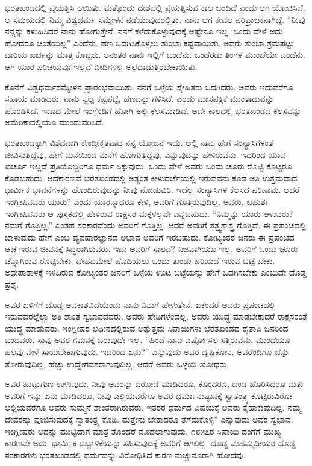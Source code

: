 ಭರತಖಂಡದಲ್ಲಿ ಪ್ರಯತ್ನಿಸಿ ಆಯಿತು. ಮತ್ತೊಂದು ದೇಶದಲ್ಲಿ ಪ್ರಯತ್ನಿಸುವ ಕಾಲ ಬಂದಿದೆ ಎಂದು ಆಗ ಯೋಚಿಸಿದೆ. ಆ ಸಮಯದಲ್ಲಿ ನಿಮ್ಮ ವಿಶ್ವಧರ್ಮ ಸಮ್ಮೇಳನ ನಡೆಯುವುದರಲ್ಲಿತ್ತು. ನಾನು ಆಗ ಕೇವಲ ಪರಿವ್ರಾಜಕನಾಗಿದ್ದೆ. “ನೀವು ನನ್ನನ್ನು ಕಳುಹಿಸಿದರೆ ನಾನು ಹೋಗುತ್ತೇನೆ. ನನಗೆ ಕಳೆದುಕೊಳ್ಳುವುದಕ್ಕೆ ಅಷ್ಟೇನೂ ಇಲ್ಲ. ಒಂದು ವೇಳೆ ಅದು ಹೋದರೂ ಚಿಂತೆಯಿಲ್ಲ” ಎಂದೆನು. ಹಣ ಒದಗಿಸಿಕೊಳ್ಳಲು ತುಂಬಾ ಕಷ್ಟವಾಯಿತು. ಅವರು ತುಂಬಾ ಶ್ರಮಪಟ್ಟು ದಾರಿಯ ಖರ್ಚನ್ನು ಮಾತ್ರ ಕೊಟ್ಟರು. ಅನಂತರ ನಾನು ಇಲ್ಲಿಗೆ ಬಂದೆನು. ಒಂದೆರಡು ತಿಂಗಳ ಮುಂಚೆಯೇ ಬಂದೆನು. ಆಗ ಯಾರ ಪರಿಚಯವೂ ಇಲ್ಲದೆ ಬೀದಿಗಳಲ್ಲಿ ಅಲೆದಾಡುತ್ತಿರಬೇಕಾಯಿತು.

ಕೊನೆಗೆ ವಿಶ್ವಧರ್ಮಸಮ್ಮೇಳನ ಪ್ರಾರಂಭವಾಯಿತು. ನನಗೆ ಒಳ್ಳೆಯ ಸ್ನೇಹಿತರು ಒದಗಿದರು. ಅವರು ಇದುವರೆಗೂ ಸಹಾಯ ಮಾಡಿದರು. ನಾನು ಸ್ವಲ್ಪ ಕಷ್ಟಪಟ್ಟೆ, ಹಣವನ್ನು ಗಳಿಸಿದೆ. ಎರಡು ಮಾಸಪತ್ರಿಕೆ ಮುಂತಾದುವನ್ನು ಹೊರಡಿಸಿದೆ. ಇದಾದ ಮೇಲೆ ಇಂಗ್ಲೆಂಡಿಗೆ ಹೋಗಿ ಅಲ್ಲಿ ಕೆಲಸಮಾಡಿದೆ. ಅದೇ ಕಾಲದಲ್ಲಿ ಭರತಖಂಡದ ಕೆಲಸವನ್ನು ಅಮೆರಿಕಾದಲ್ಲಿಯೂ ಮುಂದುವರಿಸಿದೆ.

ಭರತಖಂಡಕ್ಕಾಗಿ ವಿಶದವಾಗಿ ಕೇಂದ್ರೀಕೃತವಾದ ನನ್ನ ಯೋಜನೆ ಇದು. ಅಲ್ಲಿ ನಾವು ಹೇಗೆ ಸಂನ್ಯಾಸಿಗಳಂತೆ ಜೀವಿಸುತ್ತಿದ್ದೆವು, ಹೇಗೆ ಮನೆಯಿಂದ ಮನೆಗೆ ಹೋಗುತ್ತಿದ್ದೆವು, ಎನ್ನುವುದನ್ನು ಹೇಳಿರುವೆನು. ಇದರಿಂದ ಯಾವ ಖರ್ಚೂ ಇಲ್ಲದೆ ಪ್ರತಿಯೊಬ್ಬರಿಗೂ ಧರ್ಮ ಸಿಕ್ಕುವುದು. ಒಂದು ವೇಳೆ ಅವರು ಒಂದು ಚೂರು ರೊಟ್ಟಿ ಕೊಟ್ಟರೂ ಕೊಡಬಹುದು. ಆದಕಾರಣವೆ ಭರತಖಂಡದಲ್ಲಿ ಅತ್ಯಂತ ಕೀಳುದರ್ಜೆಯಲ್ಲಿ ಇರುವವನು ಕೂಡ ಅತಿ ಉತ್ತಮವಾದ ಧಾರ್ಮಿಕ ಭಾವನೆಗಳನ್ನು ಹೊಂದಿರುವುದನ್ನು ನೀವು ನೋಡುವಿರಿ. ಇದೆಲ್ಲ ಸಂನ್ಯಾಸಿಗಳ ಕೆಲಸದ ಪರಿಣಾಮ. ಆದರೆ ಇಂಗ್ಲೀಷಿನವರು ಯಾರು? ಎಂದು ಯಾರನ್ನಾದರೂ ಕೇಳಿ, ಅವರಿಗೆ ಗೊತ್ತಿರುವುದಿಲ್ಲ. ಅವರು, ಬಹುಶಃ ಇಂಗ್ಲೀಷಿನವರು ಆ ಪುಸ್ತಕದಲ್ಲಿ ಹೇಳಿರುವ ರಾಕ್ಷಸರ ಮಕ್ಕಳಲ್ಲವೇ ಎನ್ನಬಹುದು. “ನಿಮ್ಮನ್ನು ಯಾರು ಆಳುವರು? ನಮಗೆ ಗೊತ್ತಿಲ್ಲ.” ಎಂತಹ ಸರಕಾರವೆಂದು ಅವರಿಗೆ ಗೊತ್ತಿಲ್ಲ. ಆದರೆ ಅವರಿಗೆ ತತ್ತ್ವಶಾಸ್ತ್ರ ಗೊತ್ತಿದೆ. ಈ ಪ್ರಪಂಚದಲ್ಲಿ ಬಾಳುವುದು ಹೇಗೆ ಎಂಬ ವ್ಯವಹಾರಜ್ಞಾನದ ಅಭಾವ ಅವರಿಗೆ ಇರಬಹುದು. ಕೋಟ್ಯಂತರ ಜನರು ಈ ಪ್ರಪಂಚದ ಆಚೆ ಇರುವ ಜೀವನಕ್ಕೆ ಸಿದ್ಧರಾಗಿರುವರು. ಇದು ಅವರಿಗೆ ಸಾಲದೆ? ನಿಜವಾಗಿಯೂ ಇಲ್ಲ. ಅವರಿಗೆ ಒಂದು ಚೂರು ಚೆನ್ನಾಗಿರುವ ರೊಟ್ಟಿಬೇಕು. ದೇಹದಮೇಲೆ ಹೊದಿಯಲು ಒಂದು ತುಂಡು ಹರಿಯದೆ ಇರುವ ಬಟ್ಟೆ ಬೇಕು. ಅಧಃಪಾತಾಳಕ್ಕೆ ಇಳಿದಿರುವ ಕೋಟ್ಯಂತರ ಜನರಿಗೆ ಒಳ್ಳೆಯ ಊಟ ಬಟ್ಟೆಯನ್ನು ಹೇಗೆ ಒದಗಿಸಬೇಕು ಎಂಬುದೇ ದೊಡ್ಡ ಪ್ರಶ್ನೆ.

ಅವರ ಏಳಿಗೆಗೆ ದೊಡ್ಡ ಅವಕಾಶವಿದೆಯೆಂದು ನಾನು ನಿಮಗೆ ಹೇಳುತ್ತೇನೆ. ಏಕೆಂದರೆ ಅವರು ಪ್ರಪಂಚದಲ್ಲಿ ಇರುವವರಲ್ಲೆಲ್ಲಾ ಅತಿ ಶಾಂತ ಸ್ವಭಾವದವರು. ಅವರು ಹೇಡಿಗಳೆಂದಲ್ಲ. ಅವರು ಯುದ್ಧ ಮಾಡಬೇಕಾದರೆ ರಾಕ್ಷಸರಂತೆ ಯುದ್ಧ ಮಾಡುವರು. ಇಂಗ್ಲೀಷರ ಅಧೀನದಲ್ಲಿರುವ ಅತ್ಯುತ್ತಮ ಸಿಪಾಯಿಗಳು ಭರತಖಂಡದ ರೈತಾಪಿ ಜನರಿಂದ ಬಂದವರು. ಸಾವು ಅವರ ಗಮನಕ್ಕೆ ಬರುವುದೇ ಇಲ್ಲ. “ಹಿಂದೆ ನಾನು ಎಷ್ಟೋ ಸಲ ಸತ್ತಿರುವೆನು. ಮುಂದೆಯೂ ಹಲವು ವೇಳೆ ಸಾಯಬೇಕಾಗುವುದು. ಇದರಿಂದ ಏನು?” ಎನ್ನುವುದು ಅವರ ದೃಷ್ಟಿಕೋನ. ಅವರೆಂದಿಗೂ ಬೆನ್ನು ತೋರುವುದಿಲ್ಲ, ಹೆಚ್ಚು ಉದ್ವೇಗವಶರಾಗುವುದಿಲ್ಲ. ಆದರೆ ಅವರು ಒಳ್ಳೆಯ ಯೋಧರು.

ಅವರ ಹುಟ್ಟುಗುಣ ಉಳುವುದು. ನೀವು ಅವರನ್ನು ದರೋಡೆ ಮಾಡಿದರೂ, ಕೊಂದರೂ, ದಂಡ ಹೊರಿಸಿದರೂ ಮತ್ತು ಅವರಿಗೆ ಇನ್ನು ಏನು ಮಾಡಿದರೂ, ನೀವು ಎಲ್ಲಿಯವರೆಗೂ ಅವರ ಧರ್ಮಾನುಷ್ಠಾನಕ್ಕೆ ಸ್ವಾತಂತ್ರ್ಯ ಕೊಟ್ಟಿರುವಿರೋ ಅಲ್ಲಿಯವರೆಗೂ ಅವರು ಸುಮ್ಮನೆ ಶಾಂತರಾಗಿರುವರು. ಇತರರ ಧರ್ಮದ ವಿಷಯಕ್ಕೆ ಅವರು ಕೈಹಾಕುವುದಿಲ್ಲ. ನಮ್ಮ ದೇವರನ್ನು ಪೂಜಿಸುವುದಕ್ಕೆ ಸ್ವಾತಂತ್ರ್ಯ ಕೊಡಿ. ಮತ್ತೇನು ಬೇಕಾದರೂ ತೆಗೆದುಕೊಳ್ಳಿ” ಎನ್ನುವುದು ಅವರ ಸ್ವಭಾವ. ಇಂಗ್ಲೀಷರು ಅದನ್ನು ಮುಟ್ಟಿದಾಗ ಮಾತ್ರ ತೊಂದರೆ ಮೊದಲಾಗುವುದು. ೧೮೫೭ರ ಸಿಪಾಯಿ ದಂಗೆಗೆ ಮುಖ್ಯ ಕಾರಣವೇ ಅದು. ಧಾರ್ಮಿಕ ದಬ್ಬಾಳಿಕೆಯನ್ನು ಸಹಿಸುವುದಕ್ಕೆ ಅವರಿಗೆ ಆಗಲಿಲ್ಲ. ದೊಡ್ಡ ಮಹಮ್ಮದೀಯರ ದೊಡ್ಡ ಸರಕಾರಗಳು ಭರತಖಂಡದಲ್ಲಿ ಧರ್ಮವನ್ನು ವಿರೋಧಿಸಿದ ಕಾರಣ ನುಚ್ಚುನೂರಾಗಿ ಹೋದವು.

